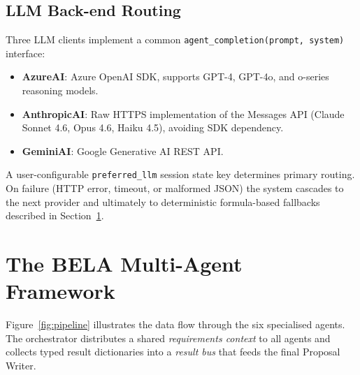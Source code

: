 \documentclass[10pt,twocolumn]{article}
\newcommand{\code}[1]{\texttt{\small #1}}
\begin{document}
\subsection{LLM Back-end Routing}

Three LLM clients implement a common \code{agent\_completion(prompt, system)} interface:
\begin{itemize}[noitemsep,topsep=2pt,leftmargin=*]
  \item \textbf{AzureAI}: Azure OpenAI SDK, supports GPT-4, GPT-4o, and o-series reasoning models.
  \item \textbf{AnthropicAI}: Raw HTTPS implementation of the Messages API
        (Claude Sonnet 4.6, Opus 4.6, Haiku 4.5), avoiding SDK dependency.
  \item \textbf{GeminiAI}: Google Generative AI REST API.
\end{itemize}
A user-configurable \code{preferred\_llm} session state key determines primary
routing. On failure (HTTP error, timeout, or malformed JSON) the system
cascades to the next provider and ultimately to deterministic formula-based
fallbacks described in Section~\ref{sec:agents}.

\section{The BELA Multi-Agent Framework}
\label{sec:agents}

Figure~\ref{fig:pipeline} illustrates the data flow through the six specialised
agents. The orchestrator distributes a shared \textit{requirements context} to
all agents and collects typed result dictionaries into a \textit{result bus}
that feeds the final Proposal Writer.
\end{document}
